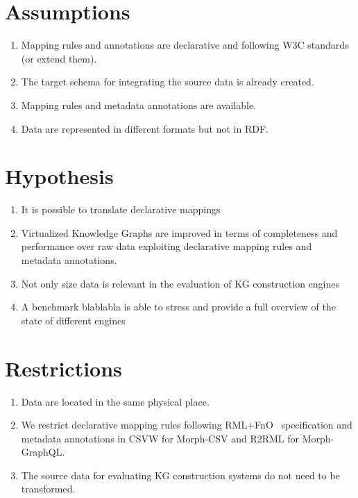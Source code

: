 \section{Assumptions}

\begin{enumerate}[label=\textbf{A{\arabic*}}]
    \item Mapping rules and annotations are declarative and following W3C standards (or extend them). 
    \item The target schema for integrating the source data is already created.
    \item Mapping rules and metadata annotations are available.
    \item Data are represented in different formats but not in RDF.
\end{enumerate}

\section{Hypothesis}

\begin{enumerate}[label=\textbf{H{\arabic*}}]
    \item It is possible to translate declarative mappings
    \item Virtualized Knowledge Graphs are improved in terms of completeness and performance over raw data exploiting declarative mapping rules and metadata annotations.
    \item Not only size data is relevant in the evaluation of KG construction engines
    \item A benchmark blablabla is able to stress and provide a full overview of the state of different engines 
\end{enumerate}

\section{Restrictions}

\begin{enumerate}[label=\textbf{R{\arabic*}}]
    \item Data are located in the same physical place.
    \item We restrict declarative mapping rules following RML+FnO~\citep{de2017declarative} specification and metadata annotations in CSVW for Morph-CSV and R2RML for Morph-GraphQL.
    \item The source data for evaluating KG construction systems do not need to be transformed.
\end{enumerate}